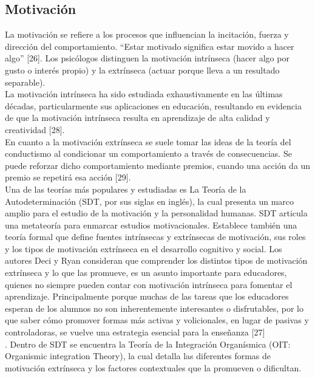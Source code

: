 \documentclass{article}
\begin{document}
\subsection{Motivación}
La motivación se refiere a los procesos que influencian la incitación, fuerza y dirección del comportamiento. “Estar motivado significa estar movido a hacer algo” [26]. Los psicólogos distinguen la motivación intrínseca (hacer algo por gusto o interés propio) y la extrínseca (actuar porque lleva a un resultado separable).\\ 
La motivación intrínseca ha sido estudiada exhaustivamente en las últimas décadas, particularmente sus aplicaciones en educación, resultando en evidencia de que la motivación intrínseca resulta en aprendizaje de alta calidad y creatividad  [28].\\
En cuanto a la motivación extrínseca se suele tomar las ideas de la teoría del conductismo al condicionar un comportamiento a través de consecuencias. Se puede reforzar dicho comportamiento mediante premios, cuando una acción da un premio se repetirá esa acción [29].\\
Una de las teorías más populares y estudiadas es La Teoría de la Autodeterminación (SDT, por sus siglas en inglés), la cual presenta un marco amplio  para el estudio de la motivación y la personalidad humanas. SDT articula una metateoría para enmarcar estudios motivacionales. Establece también una teoría formal que define fuentes intrínsecas y extrínsecas de motivación, sus roles y los  tipos de motivación extrínseca en el desarrollo cognitivo y social. Los autores Deci y Ryan consideran que comprender los distintos tipos de motivación extrínseca y lo que las promueve, es un asunto importante para educadores, quienes no siempre pueden contar con motivación intrínseca para fomentar el aprendizaje. Principalmente porque muchas de las tareas que los educadores esperan de los alumnos no son inherentemente interesantes o disfrutables, por lo que saber cómo promover formas más activas y volicionales, en lugar de pasivas y controladoras, se vuelve una estrategia esencial para la enseñanza [27]\\.
Dentro de SDT se encuentra la Teoría de la Integración Organísmica (OIT: Organismic integration Theory), la cual detalla las diferentes formas de motivación extrínseca y los factores contextuales que la promueven o dificultan.\\      
         
\end{document}
